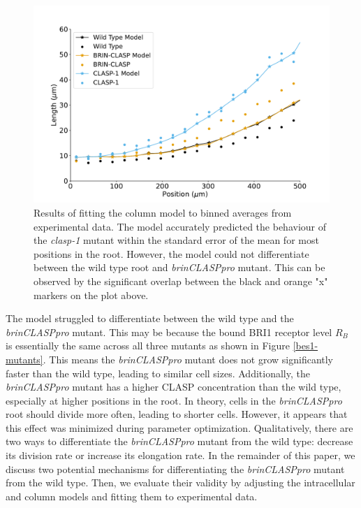 \documentclass[referee,pdflatex,sn-mathphys-num]{sn-jnl}
\begin{document}
\begin{figure}
  \centering
  \includegraphics[width=\textwidth]{column-original-fit.pdf}
\caption{Results of fitting the column model to binned averages from experimental data.
The model accurately predicted the behaviour of the \emph{clasp-1} mutant within the standard error of the mean for most positions in the root.
However, the model could not differentiate between the wild type root and \emph{brinCLASPpro} mutant.
This can be observed by the significant overlap between the black and orange "x" markers on the plot above. }
\label{column-results}
\end{figure}

The model struggled to differentiate between the wild type and the \emph{brinCLASPpro} mutant.
This may be because the bound BRI1 receptor level $R_{B}$ is essentially the same across all three mutants as shown in Figure \ref{bes1-mutants}.
This means the \emph{brinCLASPpro} mutant does not grow significantly faster than the wild type, leading to similar cell sizes.
Additionally, the \emph{brinCLASPpro} mutant has a higher CLASP concentration than the wild type, especially at higher positions in the root.
In theory, cells in the \emph{brinCLASPpro} root should divide more often, leading to shorter cells.
However, it appears that this effect was minimized during parameter optimization.
Qualitatively, there are two ways to differentiate the \emph{brinCLASPpro} mutant from the wild type: decrease its division rate or increase its elongation rate.
In the remainder of this paper, we discuss two potential mechanisms for differentiating the \emph{brinCLASPpro} mutant from the wild type.
Then, we evaluate their validity by adjusting the intracellular and column models and fitting them to experimental data.
\end{document}
